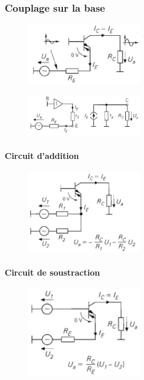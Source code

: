 \documentclass[resume]{subfiles}
\begin{document}
\begin{multicols}{3}
\subsubsection{Couplage sur la base}
\begin{figure}[H]
\centering
\includegraphics[width=5.00cm]{img_68.png}
\end{figure}
\begin{figure}[H]
\centering
\includegraphics[width=5.00cm]{img_69.png}
\end{figure}
\paragraph{Circuit d'addition}
\begin{figure}[H]
\centering
\includegraphics[width=5.00cm]{img_70.png}
\end{figure}
\paragraph{Circuit de soustraction}
\begin{figure}[H]
\centering
\includegraphics[width=5.00cm]{img_71.png}
\end{figure}

\end{multicols}
\end{document}
